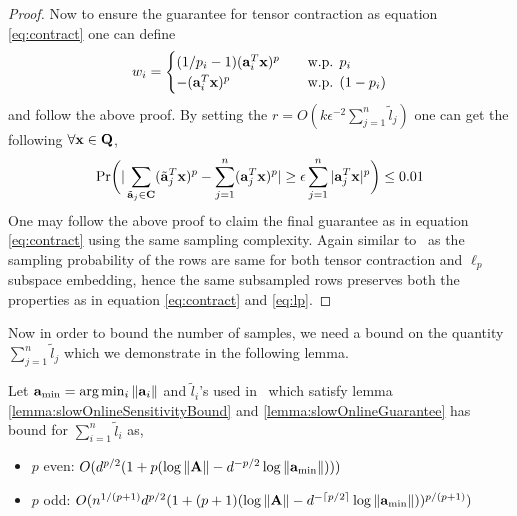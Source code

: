 \begin{proof}{\label{proof:slowOnlineGuarantee}}
Now to ensure the guarantee for tensor contraction as equation \eqref{eq:contract} one can define 
 \[ w_{i} =
  \begin{cases}
   (1/p_{i}-1)(\mathbf{a}_{i}^{T}\mathbf{x})^{p}  & \quad \text{w.p. } p_{i}\\
   -(\mathbf{a}_{i}^{T}\mathbf{x})^{p} & \quad \text{w.p. } (1-p_{i})
  \end{cases}
 \]
and follow the above proof. By setting the $r = O(k\epsilon^{-2}\sum_{j=1}^{n}\tilde{l}_{j})$ one can get the following $\forall \mathbf{x} \in \mathbf{Q}$,
\begin{equation*}
 \mbox{Pr}\bigg(|\sum_{\tilde{\mathbf{a}}_{j} \in \mathbf{C}}(\tilde{\mathbf{a}}_{j}^{T}\mathbf{x})^{p} - \sum_{j=1}^{n} (\mathbf{a}_{j}^{T}\mathbf{x})^{p}| \geq \epsilon \sum_{j=1}^{n} |\mathbf{a}_{j}^{T}\mathbf{x}|^{p}\bigg) \leq 0.01
\end{equation*}
One may follow the above proof to claim the final guarantee as in equation \ref{eq:contract} using the same sampling complexity. Again similar to \online~as the sampling probability of the rows are same for both tensor contraction and $\ell_{p}$ subspace embedding, hence the same subsampled rows preserves both the properties as in equation \eqref{eq:contract} and \eqref{eq:lp}.
\end{proof}
% 
Now in order to bound the number of samples, we need a bound on the quantity $\sum_{j=1}^{n}\tilde{l}_{j}$ which we demonstrate in the following lemma.
\begin{lemma}{\label{lemma:slowOnlineSummationBound}}
 Let $\mathbf{a}_{\min} = \text{arg}\min_{i}\|\mathbf{a}_{i}\|$ and $\tilde{l}_{i}$'s used in ~which satisfy lemma \ref{lemma:slowOnlineSensitivityBound} and \ref{lemma:slowOnlineGuarantee} has bound for $\sum_{i=1}^{n} \tilde{l}_{i}$ as,
 \begin{itemize}
  \item $p$ even: $O(d^{p/2}(1+p(\log \|\mathbf{A}\| - d^{-p/2}\log \|\mathbf{a}_{\min}\|)))$
  \item $p$ odd: $O(n^{1/(p+1)}d^{p/2}(1+(p+1)(\log \|\mathbf{A}\| - d^{-\lceil p/2\rceil}\log \|\mathbf{a}_{\min}\|))^{p/(p+1)})$
 \end{itemize}
\end{lemma}
% 
